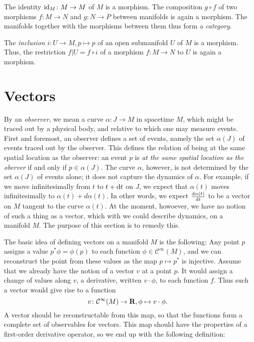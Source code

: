 The identity $\mathrm{id}_M\colon M \to M$ of $M$ is a morphism. The composition $g \circ f$
of two morphisms $f\colon M \to N$ and $g\colon N \to P$ between manifolds is
again a morphism. The manifolds together with the morphisms between them thus
form a \emph{category}.

The \emph{inclusion $i\colon U \to M, p \mapsto p$} of an open submanifold $U$
of $M$ is a morphism. Thus, the restriction $f|U = f \circ i$ of a morphism
$f\colon M \to N$ to $U$ is again a morphism.

\section{Vectors}
\label{sec:vectors}

By an \emph{observer}, we mean a curve $\alpha\colon J \to M$ in spacetime $M$,
which might be traced out by a physical body, and relative to which one may
measure events. First and foremost, an observer defines a set of events, namely
the set $\alpha(J)$ of events traced out by the observer. This defines the
relation of being at the same spatial location as the observer: an event $p$ is 
\emph{at the same spatial location as the oberver} if and only if
$p \in \alpha(J)$. The curve $\alpha$, however, is not determined by the set
$\alpha(J)$ of events alone; it does not capture the dynamics of $\alpha$.
For example, if we move infinitesimally from $t$ to $t + \mathrm d t$ on $J$, we
expect that $\alpha(t)$ moves infinitesimally to $\alpha(t) + d \alpha(t)$. In
other words, we expect $\frac{\mathrm d\alpha(t)}{\mathrm d t}$ to be a vector on $M$
tangent to the curve $\alpha(t)$. At the moment, howoever, we have no notion of
such a thing as a vector, which with we could describe dynamics, on a manifold $M$.
The purpose of this section is to remedy this.

The basic idea of defining vectors on a manifold $M$ is the following:
Any point $p$ assigns a value $p^* \phi = \phi(p)$ to each function
$\phi \in \mathcal C^\infty(M)$, and we can reconstruct the point from these
values as the map $p \mapsto p^*$
is injective. Assume that we already have the notion of a vector $v$ at a point $p$.
It would assign a change of values along $v$, a derivative, written $v \cdot \phi$, to each
function $f$. Thus such a vector would give rise to a function
\[
  v\colon \mathcal C^\infty(M) \to \mathbf{R}, \phi \mapsto v \cdot \phi.
\]
A vector should be reconstructable from this map, so that the functions form
a complete set of observables for vectors. This map should have the
properties of a first-order derivative operator, so we end up with the following
definition:

